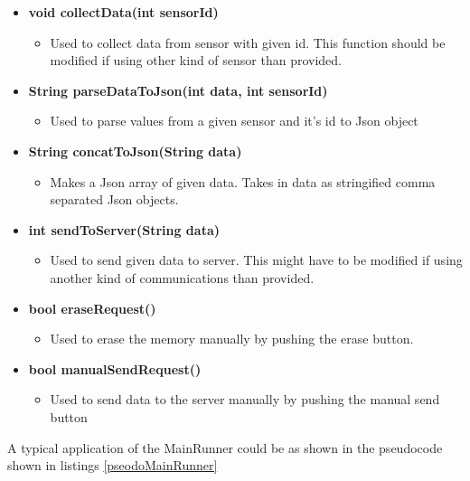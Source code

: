 \begin{itemize}
    \item \textbf{void collectData(int sensorId)}
        \begin{itemize}
            \item Used to collect data from sensor with given id. This function should
                  be modified if using other kind of sensor than provided.
        \end{itemize}
    \item \textbf{String parseDataToJson(int data, int sensorId)}
        \begin{itemize}
            \item Used to parse values from a given sensor and it's id to Json object
        \end{itemize}
    \item \textbf{String concatToJson(String data)}
        \begin{itemize}
            \item Makes a Json array of given data. Takes in data as stringified comma 
                  separated Json objects. 
        \end{itemize}
    \item \textbf{int sendToServer(String data)}
        \begin{itemize}
            \item Used to send given data to server. This might have to be modified
                  if using another kind of communications than provided.
        \end{itemize}
    \item \textbf{bool eraseRequest()}
        \begin{itemize}
            \item Used to erase the memory manually by pushing the erase button.
        \end{itemize}
    \item \textbf{bool manualSendRequest()}
        \begin{itemize}
            \item Used to send data to the server manually by pushing the manual send 
                  button
        \end{itemize}
\end{itemize}
A typical application of the MainRunner could be as shown in the pseudocode shown in listings \ref{pseodoMainRunner}

